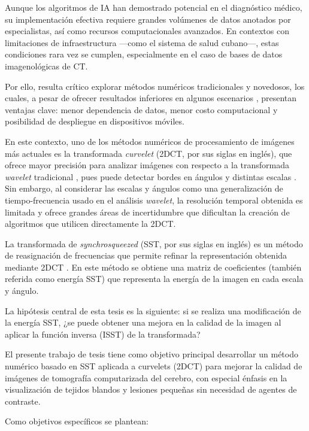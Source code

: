 Aunque los algoritmos de IA han demostrado potencial en el diagnóstico médico, su implementación efectiva requiere grandes volúmenes de datos anotados por especialistas, así como recursos computacionales avanzados. En contextos con limitaciones de infraestructura —como el sistema de salud cubano—, estas condiciones rara vez se cumplen, especialmente en el caso de bases de datos imagenológicas de CT.

Por ello, resulta crítico explorar métodos numéricos tradicionales y novedosos, los cuales, a pesar de ofrecer resultados inferiores en algunos escenarios , presentan ventajas clave: menor dependencia de datos, menor costo computacional y posibilidad de despliegue en dispositivos móviles.

En este contexto, uno de los métodos numéricos de procesamiento de imágenes más actuales es la transformada \emph{curvelet} (2DCT, por sus siglas en inglés), que ofrece mayor precisión para analizar imágenes con respecto a la transformada \emph{wavelet} tradicional \cite{Flandrin2018}, pues puede detectar bordes en ángulos y distintas escalas \cite{FastCurveletTransform}. Sin embargo, al considerar las escalas y ángulos como una generalización de tiempo-frecuencia usado en el análisis \emph{wavelet}, la resolución temporal obtenida es limitada y ofrece grandes áreas de incertidumbre que dificultan la creación de algoritmos que utilicen directamente la 2DCT.

La transformada de \emph{synchrosqueezed} (SST, por sus siglas en inglés) es un método de reasignación de frecuencias que permite refinar la representación obtenida mediante 2DCT \cite{SynchrosqueezedCurveletTransform}. En este método se obtiene una matriz de coeficientes (también referida como energía SST) que representa la energía de la imagen en cada escala y ángulo.

La hipótesis central de esta tesis es la siguiente: si se realiza una modificación de la energía SST, ¿se puede obtener una mejora en la calidad de la imagen al aplicar la función inversa (ISST) de la transformada?

El presente trabajo de tesis tiene como objetivo principal desarrollar un método numérico basado en SST aplicada a curvelets (2DCT) para mejorar la calidad de imágenes de tomografía computarizada del cerebro, con especial énfasis en la visualización de tejidos blandos y lesiones pequeñas sin necesidad de agentes de contraste.

Como objetivos específicos se plantean:


